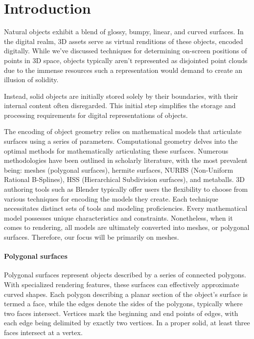 \section{Introduction}

Natural objects exhibit a blend of glossy, bumpy, linear, and curved surfaces. 
In the digital realm, 3D assets serve as virtual renditions of these objects, encoded digitally. 
While we've discussed techniques for determining on-screen positions of points in 3D space, objects typically aren't represented as disjointed point clouds due to the immense resources such a representation would demand to create an illusion of solidity.

Instead, solid objects are initially stored solely by their boundaries, with their internal content often disregarded. 
This initial step simplifies the storage and processing requirements for digital representations of objects.

The encoding of object geometry relies on mathematical models that articulate surfaces using a series of parameters. 
Computational geometry delves into the optimal methods for mathematically articulating these surfaces. 
Numerous methodologies have been outlined in scholarly literature, with the most prevalent being: meshes (polygonal surfaces), hermite surfaces, NURBS (Non-Uniform Rational B-Splines), HSS (Hierarchical Subdivision surfaces), and metaballs. 
3D authoring tools such as Blender typically offer users the flexibility to choose from various techniques for encoding the models they create. 
Each technique necessitates distinct sets of tools and modeling proficiencies.
Every mathematical model possesses unique characteristics and constraints. 
Nonetheless, when it comes to rendering, all models are ultimately converted into meshes, or polygonal surfaces. 
Therefore, our focus will be primarily on meshes.

\paragraph*{Polygonal surfaces}
Polygonal surfaces represent objects described by a series of connected polygons. 
With specialized rendering features, these surfaces can effectively approximate curved shapes. 
Each polygon describing a planar section of the object's surface is termed a face, while the edges denote the sides of the polygons, typically where two faces intersect. 
Vertices mark the beginning and end points of edges, with each edge being delimited by exactly two vertices. 
In a proper solid, at least three faces intersect at a vertex.

